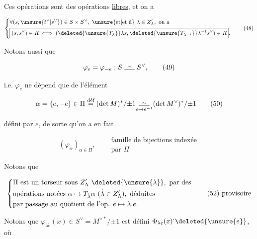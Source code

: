 Ces  opérations sont des opérations \uline{libres}, et on a

\[
\left\{\begin{aligned}
&\forall(s,\unsure{t^\vee|s^\vee})\in S\times S^\vee,\ \text{\unsure{et|et à} }\lambda\in Z'_\Lambda,\ \text{on a}\\
&\boxed{(s,s^\vee)\in R\iff(\deleted{\unsure{T_\lambda}}\lambda s,\deleted{\unsure{T_{\lambda^{-1}}}}\lambda^{-1}s^\vee)\in R}.
\end{aligned}\right. \tag*{(48)}
\]

Notons aussi que

\[
\varphi_e=\varphi_{-e}:S\mathrel{\overset{\sim}{\rule{1.5em}{0.35pt}}}S^\vee, \tag*{(49)}
\]

 i.e. $\varphi_e$ ne dépend que de l'élément

\[
\alpha=\{e,-e\}\in\Pi\overset{\text{déf}}=(\det M)^*/{\pm1}
\underset{e\mapsto e^{-1}}{\overset{\sim}{\rule{1.5em}{0.35pt}}}(\det M^\vee)^*/{\pm1} \tag*{(50)}
\]


défini par $e$, de sorte qu'on a en fait

\[
(\varphi_\alpha)_{\alpha\in\Pi},\quad
\begin{aligned}&\text{famille de bijections indexée}\\ &\text{par }\Pi\end{aligned} \tag*{(51)}
\]

Notons que 


\[
\left\{\begin{aligned}
&\Pi\ \text{est un torseur sous }Z'_\Lambda\ \deleted{\unsure{\lambda}},\ \text{par des}\\
&\text{opérations notées }\alpha\mapsto T_{\dot\lambda}\alpha\ (\dot\lambda\in Z'_\Lambda),\ \text{déduites}\\
&\text{par passage au quotient de l'op. }e\mapsto\lambda.e.
\end{aligned}\right. \tag*{\text{(52) provisoire}}
\]


 

Notons que $\varphi_{\dot\lambda\dot e}(\dot x)\in S^\vee=M^{\vee *}/{\pm1}$ est défini   $\Phi_{\lambda e}(x)^{\boldsymbol\cdot}\deleted{\unsure{e}}$, où  

